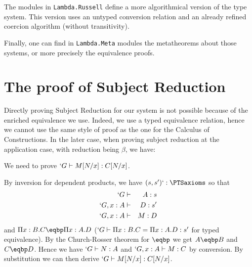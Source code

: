 \documentclass[11pt]{article}
\def\coqmodule#1{\texttt{#1}}
\begin{document}
The modules in \coqmodule{Lambda.Russell} define a more algorithmical
version of the \Russell type system. This version uses an untyped
conversion relation and an already refined coercion algorithm (without
transitivity).

Finally, one can find in \coqmodule{Lambda.Meta} modules the
metatheorems about those systems, or more precisely the equivalence proofs. 


\section*{The proof of Subject Reduction}
Directly proving Subject Reduction for our system is not possible
because of the enriched equivalence we use. Indeed, we use a typed
equivalence relation, hence we cannot use the same style of proof as the
one for the Calculus of Constructions. In the later case, when proving
subject reduction at the application case, with reduction being $\beta$, we have:
\begin{prooftree}
\end{prooftree}

\def\redonebp{"->"_{\beta\pi}}
\def\redbp{"->>"_{\beta\pi}}
\def\redpbp{"->"_{\beta\pi}^+}

We need to prove $`G \type M[N/x] : C[N/x]$.

By inversion for dependent products, we have $(s, s') `: \PTSaxioms$ so that
\begin{eqnarray*}
  `G & \type & A : s \\
  `G, x : A & \type & D : s' \\
  `G, x : A & \type & M : D
\end{eqnarray*}
and $\Pi x : B.C \eqbp \Pi x : A.D$ ($`G \type \Pi x : B.C = \Pi x : A.D
: s'$ for typed equivalence). By the Church-Rosser theorem for $\eqbp$ we
get $A \eqbp B$ and $C \eqbp D$. Hence we have $`G \type N : A$ and $`G, x
: A \type M : C$ by conversion. By substitution we can then derive
$`G \type M[N/x] : C[N/x]$.
\end{document}
